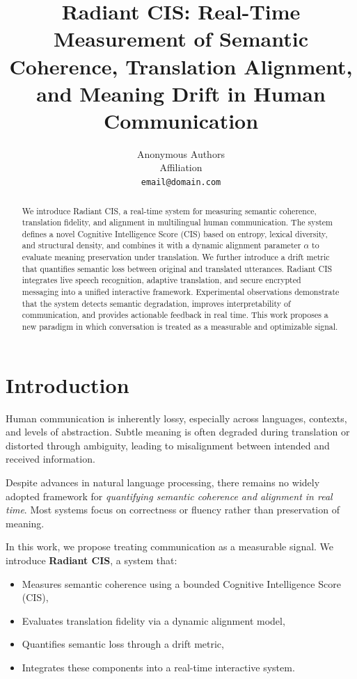 \documentclass{article}
\title{Radiant CIS: Real-Time Measurement of Semantic Coherence, Translation Alignment, and Meaning Drift in Human Communication}
\author{Anonymous Authors\\
Affiliation\\
\texttt{email@domain.com}}
\begin{document}
\maketitle

\begin{abstract}
We introduce Radiant CIS, a real-time system for measuring semantic coherence, translation fidelity, and alignment in multilingual human communication. The system defines a novel Cognitive Intelligence Score (CIS) based on entropy, lexical diversity, and structural density, and combines it with a dynamic alignment parameter $\alpha$ to evaluate meaning preservation under translation. We further introduce a drift metric that quantifies semantic loss between original and translated utterances. Radiant CIS integrates live speech recognition, adaptive translation, and secure encrypted messaging into a unified interactive framework. Experimental observations demonstrate that the system detects semantic degradation, improves interpretability of communication, and provides actionable feedback in real time. This work proposes a new paradigm in which conversation is treated as a measurable and optimizable signal.
\end{abstract}

\section{Introduction}

Human communication is inherently lossy, especially across languages, contexts, and levels of abstraction. Subtle meaning is often degraded during translation or distorted through ambiguity, leading to misalignment between intended and received information.

Despite advances in natural language processing, there remains no widely adopted framework for \emph{quantifying semantic coherence and alignment in real time}. Most systems focus on correctness or fluency rather than preservation of meaning.

In this work, we propose treating communication as a measurable signal. We introduce \textbf{Radiant CIS}, a system that:
\begin{itemize}[noitemsep]
    \item Measures semantic coherence using a bounded Cognitive Intelligence Score (CIS),
    \item Evaluates translation fidelity via a dynamic alignment model,
    \item Quantifies semantic loss through a drift metric,
    \item Integrates these components into a real-time interactive system.
\end{itemize}
\end{document}
